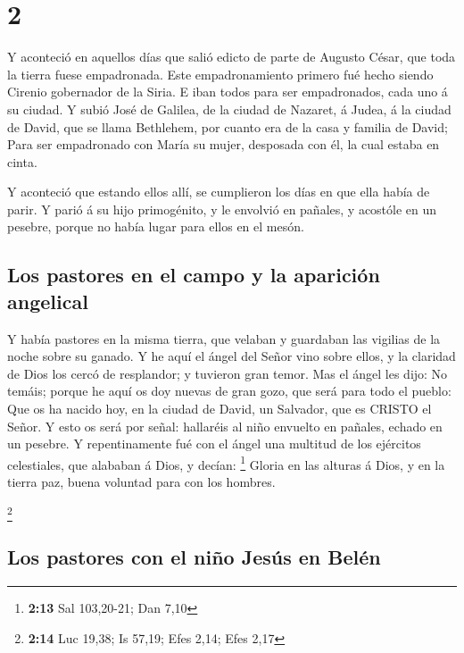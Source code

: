 \hypertarget{section-1}{%
\section{2}\label{section-1}}

 Y aconteció en aquellos días que salió edicto de parte de
Augusto César, que toda la tierra fuese empadronada.  Este
empadronamiento primero fué hecho siendo Cirenio gobernador de la Siria.
 E iban todos para ser empadronados, cada uno á su ciudad.
 Y subió José de Galilea, de la ciudad de Nazaret, á
Judea, á la ciudad de David, que se llama Bethlehem, por cuanto era de
la casa y familia de David;  Para ser empadronado con
María su mujer, desposada con él, la cual estaba en cinta.

 Y aconteció que estando ellos allí, se cumplieron los
días en que ella había de parir.  Y parió á su hijo
primogénito, y le envolvió en pañales, y acostóle en un pesebre, porque
no había lugar para ellos en el mesón.

\hypertarget{los-pastores-en-el-campo-y-la-apariciuxf3n-angelical}{%
\subsection{Los pastores en el campo y la aparición
angelical}\label{los-pastores-en-el-campo-y-la-apariciuxf3n-angelical}}

 Y había pastores en la misma tierra, que velaban y
guardaban las vigilias de la noche sobre su ganado.  Y he
aquí el ángel del Señor vino sobre ellos, y la claridad de Dios los
cercó de resplandor; y tuvieron gran temor.  Mas el ángel
les dijo: No temáis; porque he aquí os doy nuevas de gran gozo, que será
para todo el pueblo:  Que os ha nacido hoy, en la ciudad
de David, un Salvador, que es CRISTO el Señor.  Y esto os
será por señal: hallaréis al niño envuelto en pañales, echado en un
pesebre.  Y repentinamente fué con el ángel una multitud
de los ejércitos celestiales, que alababan á Dios, y decían: \footnote{\textbf{2:13}
  Sal 103,20-21; Dan 7,10}  Gloria en las alturas á Dios,
y en la tierra paz, buena voluntad para con los hombres.

\footnote{\textbf{2:14} Luc 19,38; Is 57,19; Efes 2,14; Efes 2,17}

\hypertarget{los-pastores-con-el-niuxf1o-jesuxfas-en-beluxe9n}{%
\subsection{Los pastores con el niño Jesús en
Belén}\label{los-pastores-con-el-niuxf1o-jesuxfas-en-beluxe9n}}

